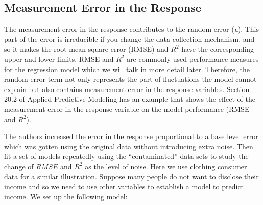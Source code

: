 \documentclass[12pt,]{krantz}
\newenvironment{Shaded}{\begin{snugshade}}{\end{snugshade}}
\newcommand{\KeywordTok}[1]{\textcolor[rgb]{0.13,0.29,0.53}{\textbf{{#1}}}}
\newcommand{\DataTypeTok}[1]{\textcolor[rgb]{0.13,0.29,0.53}{{#1}}}
\newcommand{\FloatTok}[1]{\textcolor[rgb]{0.00,0.00,0.81}{{#1}}}
\newcommand{\StringTok}[1]{\textcolor[rgb]{0.31,0.60,0.02}{{#1}}}
\newcommand{\CommentTok}[1]{\textcolor[rgb]{0.56,0.35,0.01}{\textit{{#1}}}}
\newcommand{\NormalTok}[1]{{#1}}
\theoremstyle{definition}
\theoremstyle{definition}
\theoremstyle{remark}
\begin{document}
\subsection{Measurement Error in the
Response}\label{measurement-error-in-the-response}

The measurement error in the response contributes to the random error
(\(\mathbf{\epsilon}\)). This part of the error is irreducible if you
change the data collection mechanism, and so it makes the root mean
square error (RMSE) and \(R^2\) have the corresponding upper and lower
limits. RMSE and \(R^2\) are commonly used performance measures for the
regression model which we will talk in more detail later. Therefore, the
random error term not only represents the part of fluctuations the model
cannot explain but also contains measurement error in the response
variables. Section 20.2 of Applied Predictive Modeling \citep{APM} has
an example that shows the effect of the measurement error in the
response variable on the model performance (RMSE and \(R^2\)).

The authors increased the error in the response proportional to a base
level error which was gotten using the original data without introducing
extra noise. Then fit a set of models repeatedly using the
``contaminated'' data sets to study the change of \(RMSE\) and \(R^2\)
as the level of noise. Here we use clothing consumer data for a similar
illustration. Suppose many people do not want to disclose their income
and so we need to use other variables to establish a model to predict
income. We set up the following model:

\begin{Shaded}
\end{Shaded}
\end{document}
